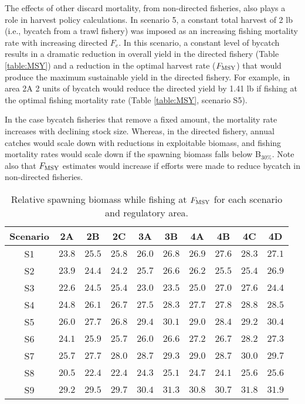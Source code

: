 The effects of other discard mortality, from non-directed fisheries, also plays a role in harvest policy calculations.  In scenario 5, a constant total harvest of 2 lb (i.e., bycatch from a trawl fishery) was imposed as an increasing fishing mortality rate with increasing directed $F_e$.  In this scenario, a constant level of bycatch results in a dramatic reduction in overall yield in the directed fishery (Table \ref{table:MSY}) and a reduction in the optimal harvest rate ($F_{\rm{MSY}}$) that would produce the maximum sustainable yield in the directed fishery.  For example, in area 2A 2 units of bycatch would reduce the directed yield by 1.41 lb if fishing at the optimal fishing mortality rate (Table \ref{table:MSY}, scenario S5).  

In the case bycatch fisheries that remove a fixed amount, the mortality rate increases with declining stock size.  Whereas, in the directed fishery, annual catches would scale down with reductions in exploitable biomass, and fishing mortality rates would scale down if the spawning biomass falls below B$_{30\%}$.  Note also that $F_{\rm{MSY}}$ estimates would increase if efforts were made to reduce bycatch in non-directed fisheries.

\begin{table}
	\caption{Relative spawning biomass while fishing at $F_{\rm{MSY}}$ for each scenario and regulatory area.}
	\label{table:Bmsy}
	\begin{center}
		\begin{tabular}{c|ccccccccc}
		\hline
		Scenario & 2A & 2B & 2C & 3A & 3B & 4A & 4B & 4C & 4D\\
		\hline		%
		S1&$23.8$&$25.5$&$25.8$&$26.0$&$26.8$&$26.9$&$27.6$&$28.3$&$27.1$\tabularnewline
		S2&$23.9$&$24.4$&$24.2$&$25.7$&$26.6$&$26.2$&$25.5$&$25.4$&$26.9$\tabularnewline
		S3&$22.6$&$24.5$&$25.4$&$23.0$&$23.5$&$25.0$&$27.0$&$27.6$&$24.4$\tabularnewline
		S4&$24.8$&$26.1$&$26.7$&$27.5$&$28.3$&$27.7$&$27.8$&$28.8$&$28.5$\tabularnewline
		S5&$26.0$&$27.7$&$26.8$&$29.4$&$30.1$&$29.0$&$28.4$&$29.2$&$30.4$\tabularnewline
		S6&$24.1$&$25.9$&$25.7$&$26.0$&$26.6$&$27.2$&$26.7$&$28.2$&$27.3$\tabularnewline
		S7&$25.7$&$27.7$&$28.0$&$28.7$&$29.3$&$29.0$&$28.7$&$30.0$&$29.7$\tabularnewline
		S8&$20.5$&$22.4$&$22.4$&$24.3$&$25.1$&$24.7$&$24.1$&$25.6$&$25.6$\tabularnewline
		S9&$29.2$&$29.5$&$29.7$&$30.4$&$31.3$&$30.8$&$30.7$&$31.8$&$31.9$\tabularnewline
		\hline
		\end{tabular}
	\end{center}
\end{table}

